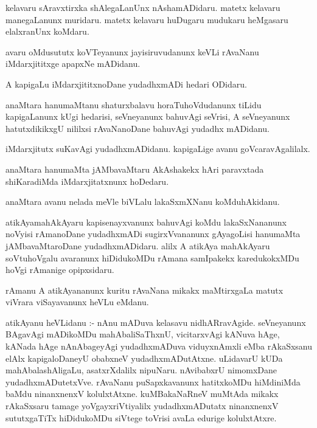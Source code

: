 \documentclass{article}
\begin{document}
\begin{mn}
kelavaru  sAravxtirxka  shAlegaLanUnx  nAshamADidaru.  matetx  kelavaru  manegaLanunx  muridaru.  matetx  kelavaru  huDugaru  
mudukaru  heMgasaru  elalxranUnx  koMdaru.
\end{mn}

\begin{mn}
avaru  oMdusututx  koVTeyanunx  jayisiruvudanunx  keVLi  rAvaNanu  iMdarxjititxge  apapxNe  mADidanu.
\end{mn}

\begin{mn}
A  kapigaLu  iMdarxjititxnoDane  yudadhxmADi  hedari  ODidaru.
\end{mn}

\begin{mn}
anaMtara  hanumaMtanu  shaturxbalavu  horaTuhoVdudanunx  tiLidu  kapigaLanunx  kUgi  hedarisi,  seVneyanunx  bahuvAgi  seVrisi,  
A  seVneyanunx  hatutxdikikxgU  nililxsi  rAvaNanoDane  bahuvAgi  yudadhx mADidanu.
\end{mn}

\begin{mn}
iMdarxjitutx  suKavAgi  yudadhxmADidanu.  kapigaLige  avanu  goVcaravAgalilalx.
\end{mn}

\begin{mn}
anaMtara  hanumaMta  jAMbavaMtaru  AkAshakekx  hAri  paravxtada  shiKaradiMda  iMdarxjitatxnunx  hoDedaru.
\end{mn}

\begin{mn}
anaMtara  avanu  nelada  meVle  biVLalu  lakaSxmXNanu  koMduhAkidanu.
\end{mn}

\begin{mn}
atikAyamahAkAyaru  kapisenayxvanunx  bahuvAgi  koMdu  lakaSxNananunx  noVyisi  rAmanoDane  yudadhxmADi  sugirxVvananunx  gAyagoLisi  
hanumaMta  jAMbavaMtaroDane  yudadhxmADidaru.  alilx  A  atikAya  mahAkAyaru  soVtuhoVgalu  avaranunx  hiDidukoMDu  rAmana  
samIpakekx  karedukokxMDu  hoVgi  rAmanige  opipxsidaru.
\end{mn}

\begin{mn}
rAmanu  A  atikAyananunx  kuritu  rAvaNana  mikakx  maMtirxgaLa  matutx  viVrara  viSayavanunx  heVLu  eMdanu.
\end{mn}

\begin{mn}
atikAyanu  heVLidanu :- nAnu  mADuva  kelasavu  nidhARravAgide.  seVneyanunx  BAgavAgi  mADikoMDu  mahAbaliSaThxnU,  vicitarxvAgi  
kANuva  hAge,  kANada  hAge  nAnAbageyAgi  yudadhxmADuva  viduyxnAmxli  eMba  rAkaSxsanu  elAlx  kapigaloDaneyU  obabxneV  
yudadhxmADutAtxne.  uLidavarU  kUDa  mahAbalashAligaLu,  asatxrXdalilx  nipuNaru.  nAvibabxrU  nimomxDane  yudadhxmADutetxVve.  
rAvaNanu  puSapxkavanunx  hatitxkoMDu  hiMdiniMda  baMdu  ninanxnenxV  kolulxtAtxne.  kuMBakaNaRneV  muMtAda  mikakx  rAkaSxsaru  
tamage  yoVgayxriVtiyalilx  yudadhxmADutatx  ninanxnenxV  sututxgaTiTx  hiDidukoMDu  siVtege  toVrisi  avaLa  edurige  kolulxtAtxre.
\end{mn}
\end{document}
